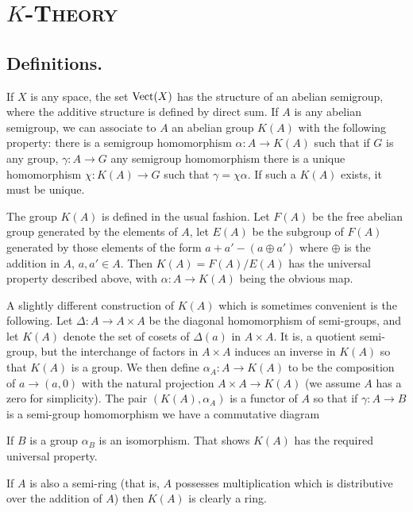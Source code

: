 \chapter{\scshape $K$-Theory}

\section{Definitions.}\label{sec:2.1} If $X$ is any space, the set $\operatorname{Vect}(X)$ has the structure of an abelian semigroup, where the additive structure is defined by direct sum. If $A$ is any abelian semigroup, we can associate to $A$ an abelian group $K(A)$ with the following property: there is a semigroup homomorphism $\alpha: A \to K(A)$ such that if $G$ is any group, $\gamma: A \to G$ any semigroup homomorphism there is a unique homomorphism $\chi: K(A) \to G$ such that $\gamma = \chi \alpha$. If such a $K(A)$ exists, it must be unique. \par

The group $K(A)$ is defined in the usual fashion. Let $F(A)$ be the free abelian group generated by the elements of $A$, let $E(A)$ be the subgroup of $F(A)$ generated by those elements of the form $a+a' - (a \oplus a')$ where $\oplus$ is the addition in $A$, $a, a' \in A$. Then $K(A) = F(A)/E(A)$ has the universal property described above, with $\alpha: A \to K(A)$ being the obvious map. \par

A slightly different construction of $K(A)$ which is sometimes convenient is the following. Let $\Delta: A \to A \times A$ be the diagonal homomorphism of semi-groups, and let $K(A)$ denote the set of cosets of $\Delta(a)$ in  $A \times A$. It is, a quotient semi-group, but the interchange of factors in $A \times A$ induces an inverse in $K(A)$ so that $K(A)$ is a group. We then define $\alpha_A: A \to K(A)$ to be the composition of $a \to (a, 0)$ with the natural projection $A \times A \to K(A)$ (we assume $A$ has a zero for simplicity). The pair $(K(A), \alpha_A)$ is a functor of $A$ so that if $\gamma: A \to B$ is a semi-group homomorphism we have a commutative diagram
\begin{center}
\end{center}
If $B$ is a group $\alpha_B$ is an isomorphism. That shows $K(A)$ has the required universal property. \par 

If $A$ is also a semi-ring (that is, $A$ possesses multiplication which is distributive over the addition of $A$) then $K(A)$ is clearly a ring. \par \hfill

